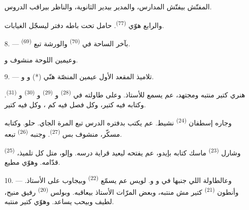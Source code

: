المفتّش بيفتّش المدارس، والمدير بيدير الثانوية، والناظر بيراقب الدروس.

والرابع هوّي  \textsuperscript{(77)}. حامل تحت باطه دفتر
ليسجّل الغيابات.

8. --- بآخر الساحة في  \textsuperscript{(70)}
والورشة تبع  \textsuperscript{(69)}.

وعيمين اللوحة منشوف   و.


\VUsaut{2.4mm}

\VUsaut{3.0mm}

9. --- تلاميذ المقعد الأول عيمين المنصّة هنّي  (*)
و و.

هنري كتير منتبه ومجتهد، عم يسمع للأستاذ. وعلى طاولته في
 \textsuperscript{(28)} و \textsuperscript{(29)}
و \textsuperscript{(30)} و
\textsuperscript{(31)}. وكتابه فيه  كتير، وكل فصل فيه كم
، وكل  فيه  كتير.

وجاره إسطفان \textsuperscript{(24)} نشيط. عم يكتب بدفتره الدرس تبع
المرة الجاي.  حلو. وكتابه مسكّر، منشوف بس 
\textsuperscript{(27)}. وجنبه  \textsuperscript{(26)}
تبعه.

وشارل \textsuperscript{(23)} ماسك كتابه بإيدو، عم يفتحه ليعيد قراية
درسه. وإلو، متل كل تلميذ،  \textsuperscript{(25)} قدّامه.
وهوّي مطيع.

10. --- وعالطاولة اللي جنبها في  و
و. لويس عم يسمّع  \textsuperscript{(22)}
وبيجاوب على  الأستاذ. وأنطون \textsuperscript{(21)} كتير
مش منتبه، وبعض المرّات الأستاذ بيعاقبه. وبولس \textsuperscript{(20)}
رفيق منيح، لطيف وبيحب يساعد. وهوّي كتير منتبه.

